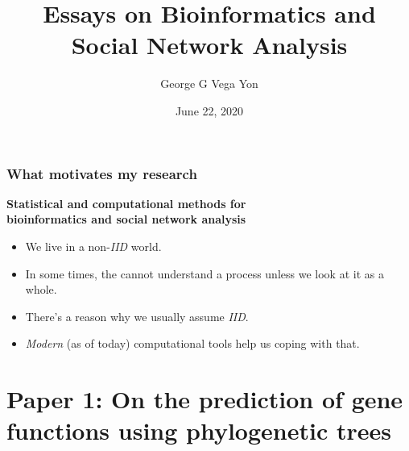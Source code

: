 \documentclass[aspectratio=169, 9pt]{beamer}
\title[Stat. Comp. for Complex Systems]{Essays on Bioinformatics and
Social Network Analysis
\linebreak{\small Statistical and Computational Methods for
Complex Systems}}
\author[GGVY]{George G Vega Yon}
\institute[USC-PREVMED]{University of Southern California, Department of Preventive Medicine}
\date{June 22, 2020}
\begin{document}
\begin{frame}%
\maketitle
\end{frame}

\begin{frame}
\frametitle{What motivates my research}

\begin{center}
\large
\textcolor{usccardinal}{\bf Statistical and computational methods for\\ %
bioinformatics and social network analysis}
\end{center}

\begin{itemize}[<+->]
\item We live in a non-{\it IID} world.
\item In some times, the cannot understand a process unless we look at it as a whole.
\item There's a reason why we usually assume {\it IID}.
\item {\it Modern} (as of today) computational tools help us coping with that.
\end{itemize}
\end{frame}



\section{Paper 1: On the prediction of gene functions using phylogenetic trees}

\end{document}
